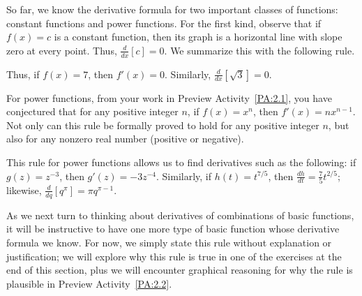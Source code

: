So far, we know the derivative formula for two important classes of functions:  constant functions and power functions.  For the first kind, observe that if $f(x) = c$ is a constant function, then its graph is a horizontal line with slope zero at every point.  Thus, $\frac{d}{dx}[c] = 0$.  We summarize this with the following rule.

\vspace*{5pt}
\nin {}
\vspace*{1pt}

Thus, if $f(x) = 7$, then $f'(x) = 0$.  Similarly, $\frac{d}{dx} [\sqrt{3}] = 0.$

For power functions, from your work in Preview Activity~\ref{PA:2.1}, you have conjectured that for any positive integer $n$, if $f(x) = x^n$, then $f'(x) = nx^{n-1}$.  Not only can this rule be formally proved to hold for any positive integer $n$, but also for any nonzero real number (positive or negative).  

\vspace*{5pt}
\nin {}
\vspace*{1pt}

This rule for power functions allows us to find derivatives such as the following:  if $g(z) = z^{-3}$, then $g'(z) = -3z^{-4}$.  Similarly, if $h(t) = t^{7/5}$, then $\frac{dh}{dt} = \frac{7}{5}t^{2/5}$; likewise, $\frac{d}{dq} [q^{\pi}] = \pi q^{\pi - 1}$. 

As we next turn to thinking about derivatives of combinations of basic functions, it will be instructive to have one more type of basic function whose derivative formula we know.  For now, we simply state this rule without explanation or justification; we will explore why this rule is true in one of the exercises at the end of this section, plus we will encounter graphical reasoning for why the rule is plausible in Preview Activity~\ref{PA:2.2}.

\vspace*{5pt}
\nin {}
\vspace*{1pt}

